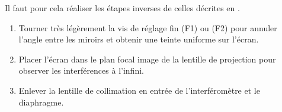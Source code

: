 \begin{protocole}
 {
  Il faut pour cela réaliser les étapes inverses de celles décrites en . 
  \begin{enumerate}
    \item Tourner très légèrement la vis de réglage fin (F1) ou (F2) pour annuler l'angle entre les miroirs et obtenir une teinte uniforme sur l'écran.
    \item Placer l'écran dans le plan focal image de la lentille de projection pour observer les  interférences à l'infini.
    \item Enlever la lentille de collimation en entrée de l'interféromètre et le diaphragme.
  \end{enumerate}
}
\end{protocole}
